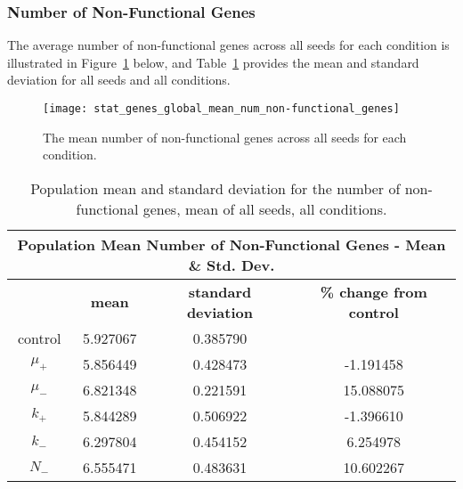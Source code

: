 \subsubsection{Number of Non-Functional Genes}
The average number of non-functional genes across all seeds for each condition is illustrated in Figure~\ref{fig:mean_num_non-functional_genes} below, and Table~\ref{table:non-functional_genes_mean_std_dev} provides the mean and standard deviation for all seeds and all conditions.  

\begin{figure}[H]
	\centering
	\texttt{[image: stat\_genes\_global\_mean\_num\_non-functional\_genes]}
	\caption[Mean number of non-functional genes]{The mean number of non-functional genes across all seeds for each condition.}
	\label{fig:mean_num_non-functional_genes}
\end{figure}


\begin{table}[h]
	\centering
	\begin{tabular}{|c|c|c|c|}
		\hline
		\multicolumn{4}{c}{\Large \textbf{Population Mean Number of Non-Functional Genes - Mean \& Std. Dev.}} \\
		\hline
		& \textbf{mean} & \textbf{standard deviation} & \textbf{\% change from control} \\
		\hline
		control & 5.927067 & 0.385790 & \textemdash \\ 
		\hline
		$\mu_+$ & 5.856449 & 0.428473 & -1.191458 \\ 
		\hline
		$\mu_-$ & 6.821348 & 0.221591 & 15.088075 \\ 
		\hline
		$k_+$ & 5.844289 & 0.506922 & -1.396610 \\ 
		\hline
		$k_-$ & 6.297804 & 0.454152 & 6.254978 \\ 
		\hline
		$N_-$ & 6.555471 & 0.483631 & 10.602267 \\ 
		\hline
	\end{tabular}
	\caption[Number of Non-functional Genes - Mean \& St. Dev.]{Population mean and standard deviation for the number of non-functional genes, mean of all seeds, all conditions.}
	\label{table:non-functional_genes_mean_std_dev}
\end{table}

